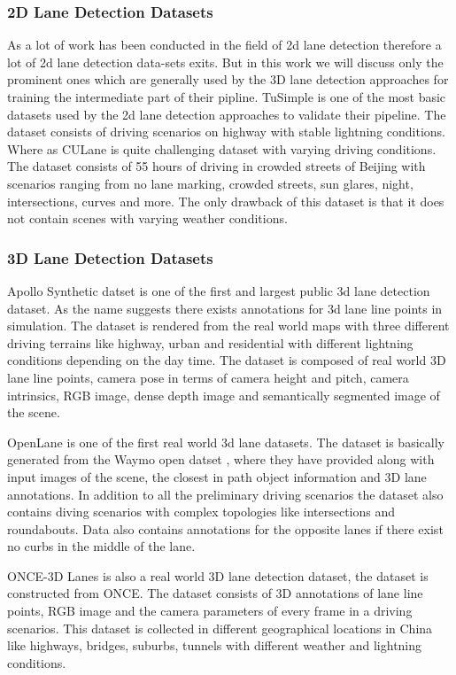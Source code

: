 \subsubsection{2D Lane Detection Datasets}
As a lot of work has been conducted in the field of 2d lane detection therefore a lot of 2d lane detection data-sets exits. But in this work we will discuss only the prominent ones which are generally used by the 3D lane detection approaches for training the intermediate part of their pipline. \cite{Tusimple} TuSimple is one of the most basic datasets used by the 2d lane detection approaches to validate their pipeline. The dataset consists of driving scenarios on highway with stable lightning conditions. Where as CULane \cite{pan2018SCNN} is quite challenging dataset with varying driving conditions. The dataset consists of 55 hours of driving in crowded streets of Beijing with scenarios ranging from no lane marking, crowded streets, sun glares, night, intersections, curves and more. The only drawback of this dataset is that it does not contain scenes with varying weather conditions.

\subsubsection{3D Lane Detection Datasets}
Apollo Synthetic datset\cite{guo2020gen} is one of the first and largest public 3d lane detection dataset. As the name suggests there exists annotations for 3d lane line points in simulation. The dataset is rendered from the real world maps with three different driving terrains like highway, urban and residential with different lightning conditions depending on the day time. The dataset is composed of real world 3D lane line points, camera pose in terms of camera height and pitch, camera intrinsics, RGB image, dense depth image and semantically segmented image of the scene.

OpenLane \cite{chen2022persformer} is one of the first real world 3d lane datasets. The dataset is basically generated from the Waymo open datset \cite{Sun_2020_CVPR}, where they have provided along with input images of the scene, the closest in path object information and 3D lane annotations. In addition to all the preliminary driving scenarios the dataset also contains diving scenarios with complex topologies like intersections and roundabouts. Data also contains annotations for the opposite lanes if there exist no curbs in the middle of the lane. 

ONCE-3D Lanes \cite{yan2022once} is also a real world 3D lane detection dataset, the dataset is constructed from ONCE\cite{mao2021one}. The dataset consists of 3D annotations of lane line points, RGB image and the camera parameters of every frame in a driving scenarios. This dataset is collected in different geographical locations in China like highways, bridges, suburbs, tunnels with different weather and lightning conditions.


